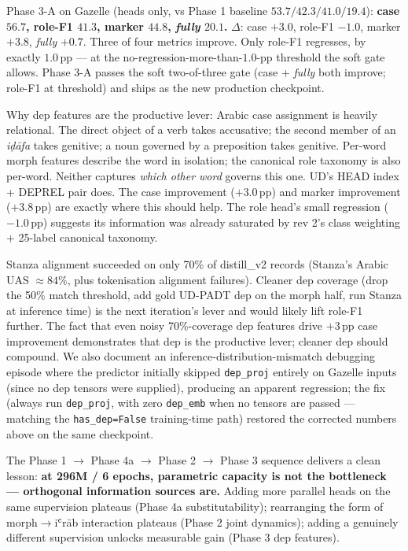 \documentclass[10pt,a4paper,twocolumn]{article}
\begin{document}
Phase 3-A on Gazelle (heads only, vs Phase 1 baseline $53.7 / 42.3 / 41.0 / 19.4$): \textbf{case $\mathbf{56.7}$, role-F1 $41.3$, marker $\mathbf{44.8}$, \emph{fully} $\mathbf{20.1}$.} $\Delta$: case $+3.0$, role-F1 $-1.0$, marker $+3.8$, \emph{fully} $+0.7$. Three of four metrics improve. Only role-F1 regresses, by exactly $1.0$\,pp --- at the no-regression-more-than-$1.0$-pp threshold the soft gate allows. Phase 3-A passes the soft two-of-three gate (case + \emph{fully} both improve; role-F1 at threshold) and ships as the new production checkpoint.

Why dep features are the productive lever: Arabic case assignment is heavily relational. The direct object of a verb takes accusative; the second member of an \emph{iḍāfa} takes genitive; a noun governed by a preposition takes genitive. Per-word morph features describe the word in isolation; the canonical role taxonomy is also per-word. Neither captures \emph{which other word} governs this one. UD's HEAD index + DEPREL pair does. The case improvement ($+3.0$\,pp) and marker improvement ($+3.8$\,pp) are exactly where this should help. The role head's small regression ($-1.0$\,pp) suggests its information was already saturated by rev 2's class weighting + 25-label canonical taxonomy.

Stanza alignment succeeded on only 70\% of distill\_v2 records (Stanza's Arabic UAS $\approx 84\%$, plus tokenisation alignment failures). Cleaner dep coverage (drop the 50\% match threshold, add gold UD-PADT dep on the morph half, run Stanza at inference time) is the next iteration's lever and would likely lift role-F1 further. The fact that even noisy 70\%-coverage dep features drive $+3$\,pp case improvement demonstrates that dep is the productive lever; cleaner dep should compound. We also document an inference-distribution-mismatch debugging episode where the predictor initially skipped \texttt{dep\_proj} entirely on Gazelle inputs (since no dep tensors were supplied), producing an apparent regression; the fix (always run \texttt{dep\_proj}, with zero \texttt{dep\_emb} when no tensors are passed --- matching the \texttt{has\_dep=False} training-time path) restored the corrected numbers above on the same checkpoint.

The Phase 1 $\rightarrow$ Phase 4a $\rightarrow$ Phase 2 $\rightarrow$ Phase 3 sequence delivers a clean lesson: \textbf{at 296M / 6 epochs, parametric capacity is not the bottleneck --- orthogonal information sources are.} Adding more parallel heads on the same supervision plateaus (Phase 4a substitutability); rearranging the form of morph$\rightarrow$iʿrāb interaction plateaus (Phase 2 joint dynamics); adding a genuinely different supervision unlocks measurable gain (Phase 3 dep features).
\end{document}
